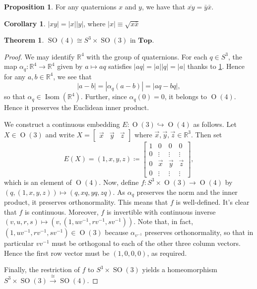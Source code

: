 \documentclass[10pt,letterpaper,cm]{nupset}
\theoremstyle{definition}
\theoremstyle{theorem}
\newtheorem{theorem}[definition]{Theorem}
\newtheorem{cor}[definition]{Corollary}
\newtheorem{prop}[definition]{Proposition}
\theoremstyle{remark}
\newcommand{\R}{\mathbb R}
\newcommand{\1}{\mathbf{1}}
\newcommand{\x}{\vec x}
\newcommand{\y}{\vec y}
\newcommand{\z}{\vec z}
\newcommand{\0}{\vec {0}}
\DeclareMathOperator{\ORT}{O}
\DeclareMathOperator{\Isom}{Isom}
\DeclareMathOperator{\SO}{SO}
\begin{document}
\bigskip

\begin{prop}
For any quaternions $x$ and $y$, we have that $\overline{xy}=\bar{y}\bar{x}$.
\end{prop}

\begin{cor}\label{mult}
$\left\lvert{xy}\right\rvert=\left\lvert{x}\right\rvert \left\lvert{y}\right\rvert$, where $\left\lvert{x}\right\rvert\equiv \sqrt{x\bar{x}}$
\end{cor}
 

\begin{theorem}
$\SO(4) \cong S^3\times \SO(3)$ in $\mathbf{Top}$.
\end{theorem}

\begin{proof}
We may identify $\R^4$ with the group of quaternions. For each $q\in S^3$, the map $\alpha_q :\R^4\to \R^4$ given by $a\mapsto aq$ satisfies $\left\lvert{aq}\right\rvert=\left\lvert{a}\right\rvert\left\lvert{q}\right\rvert=\left\lvert{a}\right\rvert$ thanks to \cref{mult}. Hence for any $a,b\in \R^4$, we see that $$\left\lvert{a-b}\right\rvert=\left\lvert{\alpha_q(a-b)}\right\rvert=\left\lvert{aq-bq}\right\rvert,$$ so that $\alpha_q \in \Isom(\R^4)$. Further, since $\alpha_q(0)=0$, it belongs to $\ORT(4)$. Hence it preserves the Euclidean inner product.

\smallskip

We construct a continuous embedding $E : \ORT(3)\hookrightarrow \ORT(4)$ as follows. Let $X\in \ORT(3)$ and write $X=\begin{bmatrix} \x & \y & \z \end{bmatrix}$ where $\x, \y, \z \in \R^3$. Then set $$E(X)=\left(1, x, y, z\right)\coloneqq \begin{bmatrix} 1 & 0 & 0 & 0 \\ 0 &  \vdots & \vdots & \vdots \\ 0 &\x & \y & \z  \\ 0 & \vdots & \vdots & \vdots \end{bmatrix},$$ which is an element of $\ORT (4)$. Now, define $f: S^3\times \ORT(3) \to \ORT(4)$ by $\left(q, \left(1,x, y, z\right)\right)\mapsto \left(q, xq, yq, zq\right)$. As $\alpha_q$ preserves the norm and the inner product, it preserves orthonormality. This means that $f$ is well-defined.  It's clear that $f$ is continuous. Moreover, $f$ is invertible with continuous inverse $\left(v, u, r, s\right)\mapsto \left(v, \left(1, uv^{-1}, rv^{-1}, sv^{-1}\right)\right)$. Note that, in fact, $\left(1, uv^{-1}, rv^{-1}, sv^{-1}\right)\in \ORT(3)$ because $\alpha_{v^{-1}}$ preserves orthonormality, so that in particular $vv^{-1}$ must be orthogonal to each of the other three column vectors. Hence the first row vector must be $\left(1,0,0,0\right)$, as required.  

\smallskip

Finally, the restriction of $f$ to $S^3 \times \SO(3)$ yields a homeomorphism $S^3\times \SO(3) \xrightarrow{\cong} \SO(4)$.  
\end{proof}
\end{document}

